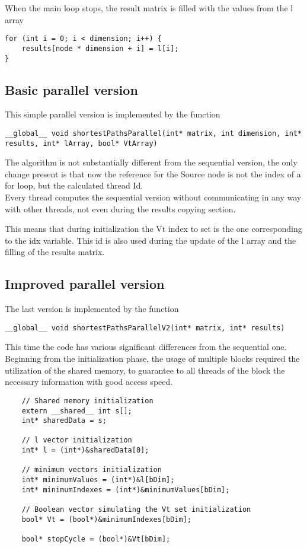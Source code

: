 \documentclass[
	a4paper, %
	12pt, %
]{class}
\begin{document}
When the main loop stops, the result matrix is filled with the values from the l array
\begin{verbatim}
for (int i = 0; i < dimension; i++) {
    results[node * dimension + i] = l[i];
}
\end{verbatim}

\subsection{Basic parallel version}
This simple parallel version is implemented by the function
\begin{verbatim}
__global__ void shortestPathsParallel(int* matrix, int dimension, int* results, int* lArray, bool* VtArray)
\end{verbatim}

The algorithm is not substantially different from the sequential version, the only change present is that now the reference for the
Source node is not the index of a for loop, but the calculated thread Id.\\

Every thread computes the sequential version without communicating in any way with other threads, not even during
the results copying section.

This means that during initialization the Vt index to set is the one corresponding to the idx variable. This id is also used during the
update of the l array and the filling of the results matrix.\\

\subsection{Improved parallel version}
The last version is implemented by the function
\begin{verbatim}
__global__ void shortestPathsParallelV2(int* matrix, int* results)
\end{verbatim}

This time the code has various significant differences from the sequential one.\\

Beginning from the initialization phase, the usage of multiple blocks required the utilization of the shared memory, to guarantee to all threads of the block
the necessary information with good access speed.
\begin{verbatim}
    // Shared memory initialization
    extern __shared__ int s[];
    int* sharedData = s;
    
    // l vector initialization
    int* l = (int*)&sharedData[0];
    
    // minimum vectors initialization
    int* minimumValues = (int*)&l[bDim];
    int* minimumIndexes = (int*)&minimumValues[bDim];
    
    // Boolean vector simulating the Vt set initialization
    bool* Vt = (bool*)&minimumIndexes[bDim];
    
    bool* stopCycle = (bool*)&Vt[bDim];
\end{verbatim}
\end{document}

